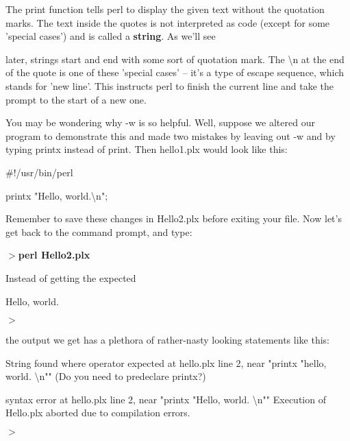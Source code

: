 \documentclass[a4paper,11pt]{book}
\begin{document}
\noindent 

\noindent The print function tells perl to display the given text without the quotation marks. The text inside the quotes is not interpreted as code (except for some 'special cases') and is called a \textbf{string}. As we'll see

\noindent later, strings start and end with some sort of quotation mark. The \textbackslash n at the end of the quote is one of these  'special cases' -- it's a type of escape sequence, which stands for 'new line'. This instructs perl to finish the current line and take the prompt to the start of a new one.

\noindent 

\noindent You may be wondering why -w is so helpful.   Well, suppose we altered our program to demonstrate this and made two mistakes by leaving out -w and by typing printx instead of print. Then hello1.plx would look like this:

\noindent 

\noindent \#!/usr/bin/perl

\noindent 

\noindent printx "Hello, world.\textbackslash n";

\noindent 

\noindent Remember to save these changes in Hello2.plx before exiting your file. Now let's get back to the command prompt, and type:

\noindent 

\noindent \textbf{$>$perl Hello2.plx}

\noindent 

\noindent Instead of getting the expected

\noindent 

\noindent Hello, world.

\noindent $>$

\noindent 

\noindent the output we get has a plethora of rather-nasty looking statements like this:

\noindent 

\noindent String found where operator expected at hello.plx line 2, near "printx "hello, world. \textbackslash n"" (Do you need to predeclare printx?)

\noindent syntax error at hello.plx line 2, near "printx "Hello, world. \textbackslash n"" Execution of Hello.plx aborted due to compilation errors.

\noindent $>$

\noindent 
\end{document}
